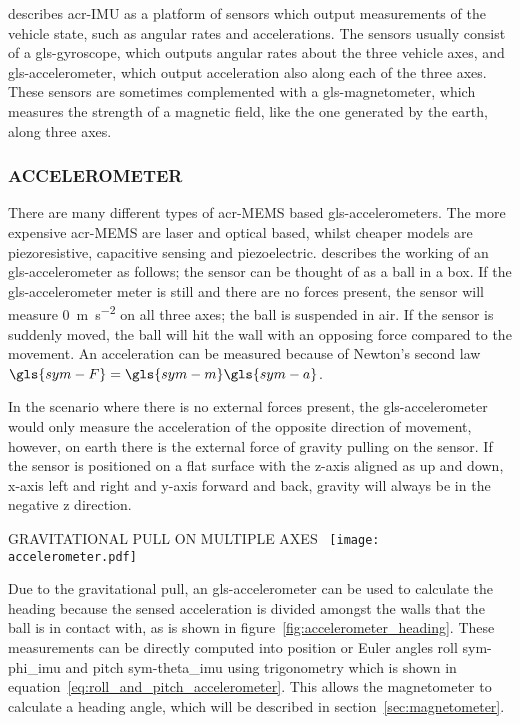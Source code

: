 \citet{leccadito_kalman_2013} describes \gls{acr-IMU} as a platform of sensors which output measurements of the
vehicle state, such as angular rates and accelerations. The sensors usually consist of a \gls{gls-gyroscope}, which
outputs angular rates about the three vehicle axes, and \gls{gls-accelerometer}, which output acceleration also along
each of the three axes. These sensors are sometimes complemented with a \gls{gls-magnetometer}, which measures the
strength of a magnetic field, like the one generated by the earth, along three axes.

\newpage

\subsubsection{ACCELEROMETER}

There are many different types of \gls{acr-MEMS} based \glspl{gls-accelerometer}. The more expensive \gls{acr-MEMS} 
are laser and optical based, whilst cheaper models are piezoresistive, capacitive sensing and piezoelectric. 
\citet{leccadito_kalman_2013} describes the working of an \gls{gls-accelerometer} as follows; the sensor can be 
thought of as a ball in a box. If the \gls{gls-accelerometer} meter is still and there are no forces present, the 
sensor will measure \SI{0}{\meter\per\second\squared} on all three axes; the ball is suspended in air. If the sensor 
is suddenly moved, the ball will hit the wall with an opposing force compared to the movement. An acceleration can be
measured because of Newton's second law \( \gls{sym-F} = \gls{sym-m}  \gls{sym-a}  \).

In the scenario where there is no external forces present, the \gls{gls-accelerometer} would only measure the
acceleration of the opposite direction of movement, however, on earth there is the external force of gravity pulling on
the sensor. If the sensor is positioned on a flat surface with the z-axis aligned as up and down, x-axis left and right
and y-axis forward and back, gravity will always be in the negative z direction.

\begin{RoyalFigure}[!htb, label=fig:accelerometer_heading]{GRAVITATIONAL PULL ON MULTIPLE
AXES~\cite{leccadito_kalman_2013}}
    \texttt{[image: accelerometer.pdf]}
\end{RoyalFigure}

Due to the gravitational pull, an \gls{gls-accelerometer} can be used to calculate the heading because the sensed 
acceleration is divided amongst the walls that the ball is in contact with, as is shown in 
figure~\ref{fig:accelerometer_heading}. These measurements can be directly computed into position or Euler angles 
roll \gls{sym-phi_imu} and pitch \gls{sym-theta_imu} using trigonometry which is shown in 
equation~\ref{eq:roll_and_pitch_accelerometer}. This allows the magnetometer to calculate a heading angle, which will
be described in section~\ref{sec:magnetometer}.

